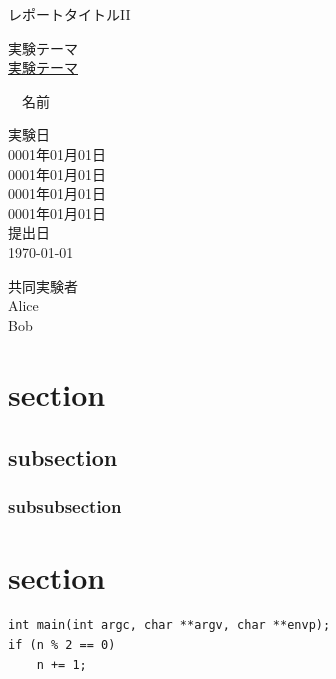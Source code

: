 \documentclass{bxjsarticle}
\begin{document}
\begin{center}
  \Huge レポートタイトルI\hspace{-3pt}I \par
  \vspace{15mm}
  \LARGE 実験テーマ \\ \underline{実験テーマ} \par
  \vspace{10mm}　名前\\ \par
  \vspace{40mm}
  \Large 実験日\\0001年01月01日\\
                 0001年01月01日\\
				 0001年01月01日\\
				 0001年01月01日\\
  \vspace{5mm}
         提出日\\ \today \par



  \vspace{15mm}
  \Large 共同実験者\\Alice \\
                     Bob   \\

\end{center}

\thispagestyle{empty}
\clearpage
\addtocounter{page}{-1}

\newpage

\section{section}
\subsection{subsection}
\subsubsection{subsubsection}

\section{section}

\begin{lstlisting}[caption=プログラム, label=prog:prog]
int main(int argc, char **argv, char **envp);
if (n % 2 == 0)
	n += 1;
\end{lstlisting}
\end{document}
